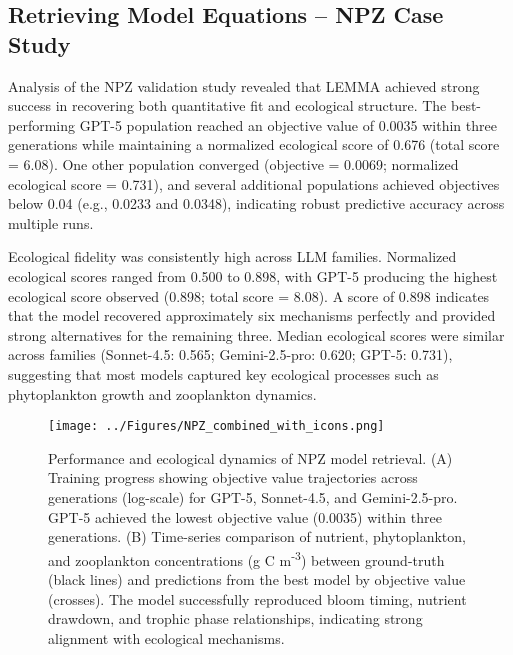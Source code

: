 \subsection{Retrieving Model Equations -- NPZ Case Study}


Analysis of the NPZ validation study revealed that LEMMA achieved strong success in recovering both quantitative fit and ecological structure. The best-performing GPT-5 population reached an objective value of 0.0035 within three generations while maintaining a normalized ecological score of 0.676 (total score = 6.08). One other population converged (objective = 0.0069; normalized ecological score = 0.731), and several additional populations achieved objectives below 0.04 (e.g., 0.0233 and 0.0348), indicating robust predictive accuracy across multiple runs.

Ecological fidelity was consistently high across LLM families. Normalized ecological scores ranged from 0.500 to 0.898, with GPT-5 producing the highest ecological score observed (0.898; total score = 8.08). A score of 0.898 indicates that the model recovered approximately six mechanisms perfectly and provided strong alternatives for the remaining three. Median ecological scores were similar across families (Sonnet-4.5: 0.565; Gemini-2.5-pro: 0.620; GPT-5: 0.731), suggesting that most models captured key ecological processes such as phytoplankton growth and zooplankton dynamics.

\begin{figure}[H]
\centering
\texttt{[image: ../Figures/NPZ\_combined\_with\_icons.png]}
\caption{Performance and ecological dynamics of NPZ model retrieval. (A) Training progress showing objective value trajectories across generations (log-scale) for GPT-5, Sonnet-4.5, and Gemini-2.5-pro. GPT-5 achieved the lowest objective value (0.0035) within three generations. (B) Time-series comparison of nutrient, phytoplankton, and zooplankton concentrations (g C m\textsuperscript{-3}) between ground-truth (black lines) and predictions from the best model by objective value (crosses). The model successfully reproduced bloom timing, nutrient drawdown, and trophic phase relationships, indicating strong alignment with ecological mechanisms.}
\label{fig:npz_timeseries}
\end{figure}

